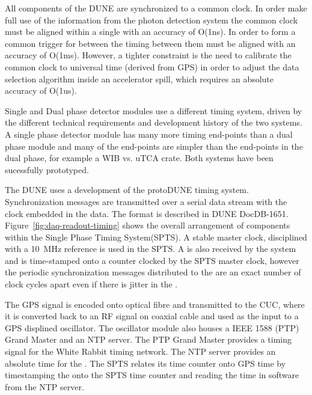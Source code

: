 
All components of the DUNE   are
synchronized to a common clock.  In order make full use of the
information from the photon detection system the common clock must be
aligned within a single  with an accuracy of O(1ns).
In order to form a common trigger for  between
 the timing between them must be aligned with an
accuracy of O(1ms).  However, a tighter constraint is the need to
calibrate the common clock to universal time (derived from GPS) in
order to adjust the data selection algorithm inside an accelerator
spill, which requires an absolute accuracy of O(1us).

Single and Dual phase detector modules use a different timing system,
driven by the different technical requirements and development history
of the two systems. A single phase detector module has many more
timing end-points than a dual phase module and many of the end-points
are simpler than the end-points in the dual phase, for example a WIB
vs. uTCA crate. Both systems have been sucessfully prototyped.

The DUNE   uses a development of the protoDUNE
timing system. Synchronization messages are transmitted over a serial
data stream with the clock embedded in the data. The format is
described in DUNE DocDB-1651. Figure~\ref{fig:daq-readout-timing}
shows the overall arrangement of components within the Single Phase
Timing System(SPTS). A stable master clock, disciplined with a \SI{10}{\MHz}
reference is used in the SPTS. A  is
also received by the system and is time-stamped onto a counter clocked
by the SPTS master clock, however the periodic synchronization
messages distributed to the   are an exact number
of clock cycles apart even if there is jitter in the .

The GPS signal is encoded onto optical fibre and transmitted to the
CUC, where it is converted back to an RF signal on coaxial cable and
used as the input to a GPS displined oscillator. The oscillator module
also houses a IEEE 1588 (PTP) Grand Master and an NTP server. The PTP
Grand Master provides a timing signal for the  White Rabbit
timing network. The NTP server provides an absolute time for the
. The SPTS relates its time counter onto GPS time by
timestamping the  onto the SPTS time counter and reading
the time in software from the NTP server.

